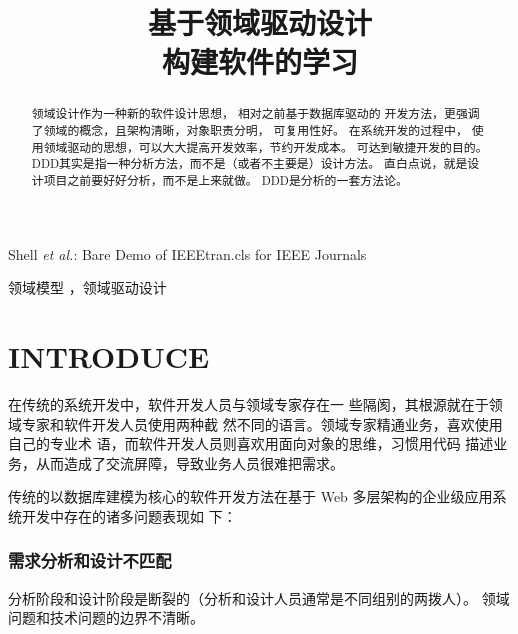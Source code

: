 \documentclass[journal]{IEEEtran}
\begin{document}
\begin{CJK*}{UTF8}{gbsn}


\title{基于领域驱动设计\\构建软件的学习}


%
%

\markboth{ }
{Shell \MakeLowercase{\textit{et al.}}: Bare Demo of IEEEtran.cls for IEEE Journals}


\maketitle



\begin{abstract} 
  领域设计作为一种新的软件设计思想， 相对之前基于数据库驱动的
  开发方法，更强调了领域的概念，且架构清晰，对象职责分明， 可复用性好。 
  在系统开发的过程中，
  使用领域驱动的思想，可以大大提高开发效率，节约开发成本。
  可达到敏捷开发的目的。
  DDD其实是指一种分析方法，而不是（或者不主要是）设计方法。
  直白点说，就是设计项目之前要好好分析，而不是上来就做。
  DDD是分析的一套方法论。  
\end{abstract}


\begin{IEEEkeywords} 
  领域模型 ，领域驱动设计
\end{IEEEkeywords}



\IEEEpeerreviewmaketitle



\section{INTRODUCE}
 
在传统的系统开发中，软件开发人员与领域专家存在一
些隔阂，其根源就在于领域专家和软件开发人员使用两种截
然不同的语言。领域专家精通业务，喜欢使用自己的专业术
语，而软件开发人员则喜欢用面向对象的思维，习惯用代码
描述业务，从而造成了交流屏障，导致业务人员很难把需求。

传统的以数据库建模为核心的软件开发方法在基于 Web
多层架构的企业级应用系统开发中存在的诸多问题表现如
下：

\subsubsection {需求分析和设计不匹配}
分析阶段和设计阶段是断裂的（分析和设计人员通常是不同组别的两拨人）。
领域问题和技术问题的边界不清晰。
 

\end{CJK*}
\end{document}

